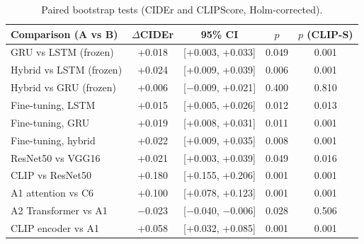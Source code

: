 \documentclass[11pt]{article}
\newcommand{\tbl}[2]{\caption{#1}{\sffamily\small #2}}
\newcommand{\tabnote}[1]{\par\vspace{3pt}{\noindent\sffamily\footnotesize\raggedright #1\par}}
\begin{document}
\begin{table}[H]\centering
\tbl{Paired bootstrap tests (CIDEr and CLIPScore, Holm-corrected).}
{\begin{tabular}{lcccc}\toprule
Comparison (A vs B) & $\Delta$CIDEr & 95\% CI & $p$ & $p$ (CLIP-S)\\\midrule
GRU vs LSTM (frozen) & +0.018 & [+0.003, +0.033] & 0.049 & 0.001\\
Hybrid vs LSTM (frozen) & +0.024 & [+0.009, +0.039] & 0.006 & 0.001\\
Hybrid vs GRU (frozen) & +0.006 & [$-$0.009, +0.021] & 0.400 & 0.810\\
Fine-tuning, LSTM & +0.015 & [+0.005, +0.026] & 0.012 & 0.013\\
Fine-tuning, GRU & +0.019 & [+0.008, +0.031] & 0.011 & 0.001\\
Fine-tuning, hybrid & +0.022 & [+0.009, +0.035] & 0.008 & 0.001\\
ResNet50 vs VGG16 & +0.021 & [+0.003, +0.039] & 0.049 & 0.016\\
CLIP vs ResNet50 & +0.180 & [+0.155, +0.206] & 0.001 & 0.001\\
A1 attention vs C6 & +0.100 & [+0.078, +0.123] & 0.001 & 0.001\\
A2 Transformer vs A1 & $-$0.023 & [$-$0.040, $-$0.006] & 0.028 & 0.506\\
CLIP encoder vs A1 & +0.058 & [+0.032, +0.085] & 0.001 & 0.001\\\bottomrule
\end{tabular}}
\tabnote{$p=0.001$ is the smallest value 10,000 resamples and the Holm correction can produce here.}
\end{table}
\end{document}
